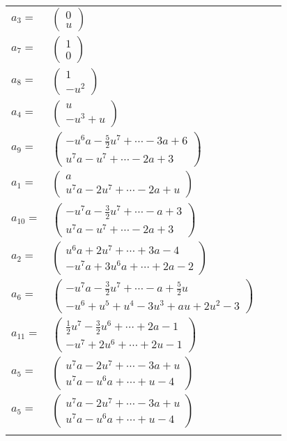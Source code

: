 \documentclass[1p]{elsarticle_modified}
\theoremstyle{definition}
\begin{document}
\begin{tabular}{m{7pt} m{180pt} m{7pt} m{180pt} }
\flushright $a_{3}=$&$\begin{pmatrix}0\\u\end{pmatrix}$ \\
\flushright $a_{7}=$&$\begin{pmatrix}1\\0\end{pmatrix}$ \\
\flushright $a_{8}=$&$\begin{pmatrix}1\\- u^2\end{pmatrix}$ \\
\flushright $a_{4}=$&$\begin{pmatrix}u\\- u^3+u\end{pmatrix}$ \\
\flushright $a_{9}=$&$\begin{pmatrix}- u^6 a-\frac{5}{2} u^7+\cdots-3 a+6\\u^7 a- u^7+\cdots-2 a+3\end{pmatrix}$ \\
\flushright $a_{1}=$&$\begin{pmatrix}a\\u^7 a-2 u^7+\cdots-2 a+u\end{pmatrix}$ \\
\flushright $a_{10}=$&$\begin{pmatrix}- u^7 a-\frac{3}{2} u^7+\cdots- a+3\\u^7 a- u^7+\cdots-2 a+3\end{pmatrix}$ \\
\flushright $a_{2}=$&$\begin{pmatrix}u^6 a+2 u^7+\cdots+3 a-4\\- u^7 a+3 u^6 a+\cdots+2 a-2\end{pmatrix}$ \\
\flushright $a_{6}=$&$\begin{pmatrix}- u^7 a-\frac{3}{2} u^7+\cdots- a+\frac{5}{2} u\\- u^6+u^5+u^4-3 u^3+a u+2 u^2-3\end{pmatrix}$ \\
\flushright $a_{11}=$&$\begin{pmatrix}\frac{1}{2} u^7-\frac{3}{2} u^6+\cdots+2 a-1\\- u^7+2 u^6+\cdots+2 u-1\end{pmatrix}$ \\
\flushright $a_{5}=$&$\begin{pmatrix}u^7 a-2 u^7+\cdots-3 a+u\\u^7 a- u^6 a+\cdots+u-4\end{pmatrix}$\\ \flushright $a_{5}=$&$\begin{pmatrix}u^7 a-2 u^7+\cdots-3 a+u\\u^7 a- u^6 a+\cdots+u-4\end{pmatrix}$\\&\end{tabular}
\end{document}
